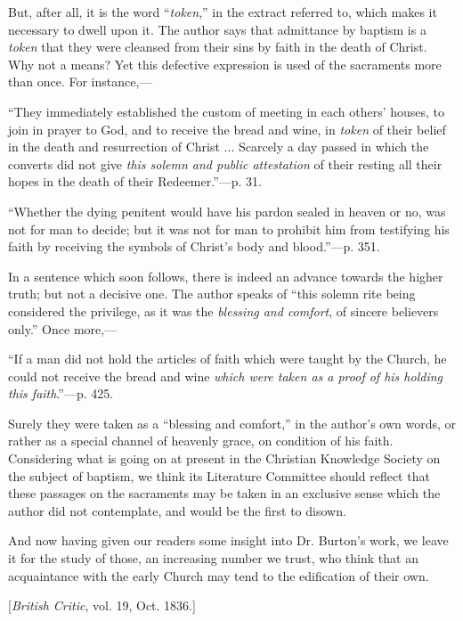 But, after
all, it is the word ``\emph{token},'' in the extract referred to,
which makes it necessary to dwell upon it. The author says that
admittance by baptism is a \emph{token} that they were cleansed from
their sins by faith in the death of Christ. Why not a means? Yet this
defective expression is used of the sacraments more than once. For
instance,—

``They
immediately established the custom of meeting in each others' houses,
to join in prayer to God, and to receive the bread and wine, in \emph{token}
of their belief in the death and resurrection of Christ ... Scarcely a
day passed in which the converts did not give \emph{this solemn and public
attestation} of their resting all their hopes in the death of their
Redeemer.''—p. 31.

``Whether
the dying penitent would have his pardon sealed in heaven or no, was not
for man to decide; but it was not for man to prohibit him from
testifying his faith by receiving the symbols of Christ's body and
blood.''—p. 351.

In a
sentence which soon follows, there is indeed an advance towards the
higher truth; but not a decisive one. The author speaks of ``this
solemn rite being considered the privilege, as it was the \emph{blessing
and comfort}, of sincere believers only.'' Once more,—

``If a man
did not hold the articles of faith which were taught by the Church, he
could not receive the bread and wine \emph{which were taken as a proof of
his holding this faith}.''—p. 425.

Surely they
were taken as a ``blessing and comfort,'' in the author's own words,
or rather as a special channel of heavenly grace, on condition of his
faith. Considering what is going on at present in the Christian
Knowledge Society on the subject of baptism, we think its Literature
Committee should reflect that these passages on the sacraments may be
taken in an exclusive sense which the author did not contemplate, and
would be the first to disown.

And now
having given our readers some insight into Dr. Burton's work, we leave
it for the study of those, an increasing number we trust, who think that
an acquaintance with the early Church may tend to the edification of
their own.


[\emph{British Critic}, vol. 19, Oct. 1836.]


